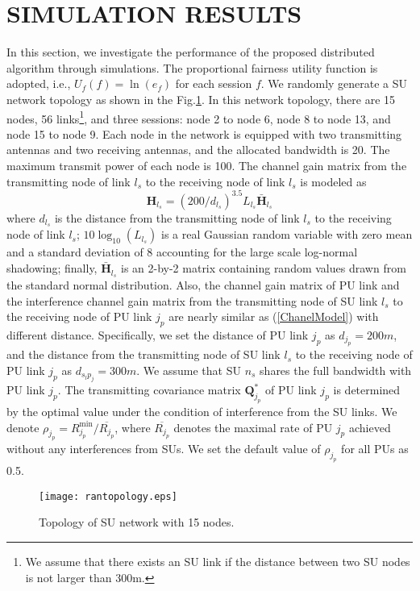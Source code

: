 \documentclass[12pt,onecolumn,tworows]{IEEEtran}
\begin{document}
\section{SIMULATION RESULTS}
In this section, we investigate the performance of the proposed distributed algorithm through simulations. The proportional fairness utility function is adopted, i.e., $U_f(f)=\ln (e_f)$ for each session $f$. We randomly generate a SU network topology as shown in the Fig.\ref{fig:fig1}. In this network topology, there are 15 nodes, 56 links\footnote{We assume that there exists an SU link if the distance between two SU nodes is not larger than 300m.}, and three sessions: node 2 to node 6, node 8 to node 13, and node 15 to node 9. Each node in the network is equipped with two transmitting antennas and two receiving antennas, and the allocated bandwidth is 20. The maximum transmit power of each node is 100. The channel gain matrix from the transmitting node of link $l_s$ to the receiving node of
link $l_s$ is modeled as
\begin{equation}\label{ChanelModel}
\mathbf{H}_{l_s}=(200/d_{l_s})^{3.5}L_{l_s}\bar{\mathbf{H}}_{l_s}
\end{equation}
where $d_{l_s}$ is the distance from the transmitting node of link $l_s$ to the receiving node of link $l_s$; $10\log_{10}(L_{l_s})$ is
a real Gaussian random variable with zero mean and a standard deviation of 8 accounting for
the large scale
log-normal shadowing; finally, $\bar{\mathbf{H}}_{l_s}$ is an 2-by-2 matrix containing random values drawn from the standard normal distribution.
Also, the channel gain matrix of PU link and the interference channel gain matrix from the transmitting node of SU link ${l_s}$ to the receiving node of PU link ${j_p}$ are
nearly similar as (\ref{ChanelModel}) with different distance. Specifically, we set the distance of PU link ${j_p}$ as $d_{j_p}=200m$, and the distance from the transmitting node of SU link ${l_s}$ to the receiving node of PU link ${j_p}$ as $d_{s_lp_j}=300m$. We assume that SU $n_s$ shares the full bandwidth with PU link $j_p$. The transmitting covariance matrix $\mathbf{Q}_{j_p}^{*}$ of PU link $j_p$ is determined by the optimal value under the condition of interference from the SU links.
We denote $\rho_{j_p}=R_{j_p}^{\text{min}}/\overline{R_{j_p}}$,
where $\overline{R_{j_p}}$ denotes the maximal rate of PU $j_p$ achieved without any interferences from SUs.
We set the default value of $\rho_{j_p}$ for all PUs as 0.5.


\begin{figure}
\centering
\texttt{[image: rantopology.eps]}
\centering
\caption{Topology of SU network with 15 nodes.}
\centering
\label{fig:fig1}
\centering
\end{figure}
\end{document}
